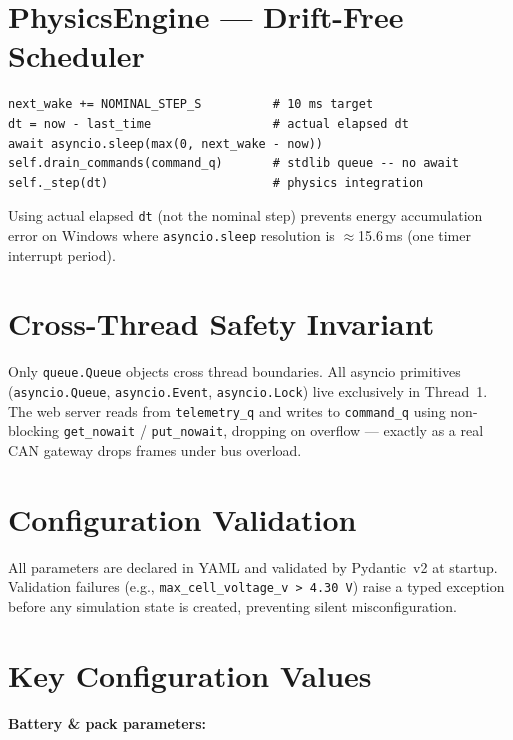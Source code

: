 \documentclass[12pt, a4paper, openany]{report}
\newcommand{\code}[1]{\texttt{#1}}
\begin{document}
\section{PhysicsEngine --- Drift-Free Scheduler}

\begin{lstlisting}[style=python, caption={Drift-free 10\,ms scheduler in PhysicsEngine.run()}]
next_wake += NOMINAL_STEP_S          # 10 ms target
dt = now - last_time                 # actual elapsed dt
await asyncio.sleep(max(0, next_wake - now))
self.drain_commands(command_q)       # stdlib queue -- no await
self._step(dt)                       # physics integration
\end{lstlisting}

Using actual elapsed \code{dt} (not the nominal step) prevents energy
accumulation error on Windows where \code{asyncio.sleep} resolution is
$\approx$15.6\,ms (one timer interrupt period).

\section{Cross-Thread Safety Invariant}

Only \code{queue.Queue} objects cross thread boundaries. All asyncio
primitives (\code{asyncio.Queue}, \code{asyncio.Event}, \code{asyncio.Lock})
live exclusively in Thread~1. The web server reads from \code{telemetry\_q}
and writes to \code{command\_q} using non-blocking \code{get\_nowait} /
\code{put\_nowait}, dropping on overflow --- exactly as a real CAN gateway
drops frames under bus overload.

\section{Configuration Validation}

All parameters are declared in YAML and validated by Pydantic~v2 at startup.
Validation failures (e.g., \code{max\_cell\_voltage\_v > 4.30\,V}) raise
a typed exception before any simulation state is created, preventing silent
misconfiguration.

\section{Key Configuration Values}

\noindent\textbf{Battery \& pack parameters:}
\end{document}
